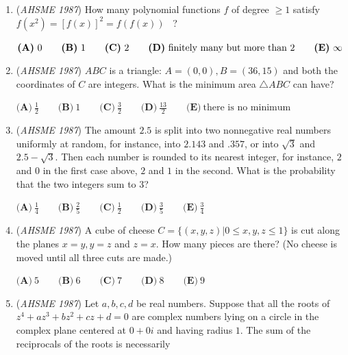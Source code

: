 \begin{enumerate}
 $\textbf{(A)}\ 1<p\le 11 \qquad \textbf{(B)}\ 11<p \le 21 \qquad \textbf{(C)}\ 21< p \le 31 \\ \qquad \textbf{(D)}\ 31< p\le 41\qquad \textbf{(E)}\ 41< p\le 51$


	\item (\textit{AHSME 1987}) How many polynomial functions $f$ of degree $\ge 1$ satisfy
$f(x^2)=[f(x)]^2=f(f(x))$  ?


 $\textbf{(A)}\ 0 \qquad \textbf{(B)}\ 1 \qquad \textbf{(C)}\ 2 \qquad \textbf{(D)}\ \text{finitely many but more than 2}\\ \qquad \textbf{(E)}\ \infty$


	\item (\textit{AHSME 1987}) $ABC$ is a triangle: $A=(0,0), B=(36,15)$ and both the coordinates of $C$ are integers. What is the minimum area $\triangle ABC$ can have?


 $\textbf{(A)}\ \frac{1}{2} \qquad \textbf{(B)}\ 1 \qquad \textbf{(C)}\ \frac{3}{2} \qquad \textbf{(D)}\ \frac{13}{2}\qquad \textbf{(E)}\ \text{there is no minimum}$


	\item (\textit{AHSME 1987}) The amount $2.5$ is split into two nonnegative real numbers uniformly at random, 
for instance, into $2.143$ and $.357$, or into $\sqrt{3}$ and $2.5-\sqrt{3}$. 
Then each number is rounded to its nearest integer, for instance, $2$ and $0$ in the first case above, 
$2$ and $1$ in the second. What is the probability that the two integers sum to $3$?


 $\textbf{(A)}\ \frac{1}{4} \qquad \textbf{(B)}\ \frac{2}{5} \qquad \textbf{(C)}\ \frac{1}{2} \qquad \textbf{(D)}\ \frac{3}{5}\qquad \textbf{(E)}\ \frac{3}{4}$


	\item (\textit{AHSME 1987}) A cube of cheese $C=\{(x, y, z)| 0 \le x, y, z \le 1\}$ is cut along the planes $x=y, y=z$ and $z=x$. How many pieces are there? 
(No cheese is moved until all three cuts are made.)


 $\textbf{(A)}\ 5 \qquad \textbf{(B)}\ 6 \qquad \textbf{(C)}\ 7 \qquad \textbf{(D)}\ 8 \qquad \textbf{(E)}\ 9$


	\item (\textit{AHSME 1987}) Let $a, b, c, d$ be real numbers. Suppose that all the roots of $z^4+az^3+bz^2+cz+d=0$ are complex numbers lying on a circle
in the complex plane centered at $0+0i$ and having radius $1$. The sum of the reciprocals of the roots is necessarily



\end{enumerate}
